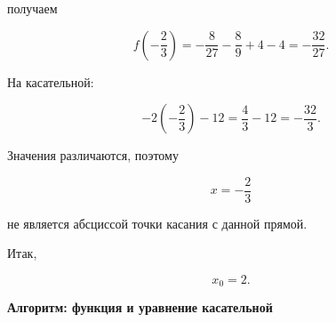 \documentclass[a4paper,12pt]{article}
\begin{document}
получаем

\[
f\!\left(-\frac23\right)
=
-\frac{8}{27}
-
\frac89
+
4
-
4
=
-\frac{32}{27}.
\]

На касательной:

\[
-2\left(-\frac23\right)-12
=
\frac43-12
=
-\frac{32}{3}.
\]

Значения различаются, поэтому

\[
x=-\frac23
\]

не является абсциссой точки касания с данной прямой.

Итак,

\[
\boxed{
x_0=2
}.
\]


\clearpage
\thispagestyle{empty}

\begin{center}

{\Large\bfseries\color{darkaccent}
Алгоритм: функция и уравнение касательной
}

\end{center}

\vspace{7mm}
\end{document}
